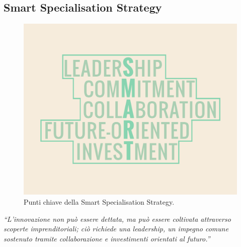 \subsection{Smart Specialisation Strategy}
\begin{figure}[H]
	\begin{center}
	\includegraphics[scale=0.15]{immagini/SMART.png}
	\caption{Punti chiave della Smart Specialisation Strategy.}
	\end{center}
\end{figure}

\begin{flushright}{
	\slshape    
	``L'innovazione non può essere dettata, ma può essere coltivata attraverso scoperte imprenditoriali; ciò richiede una leadership, un impegno comune sostenuto tramite collaborazione e investimenti orientati al futuro.''} \\ 
\end{flushright}


